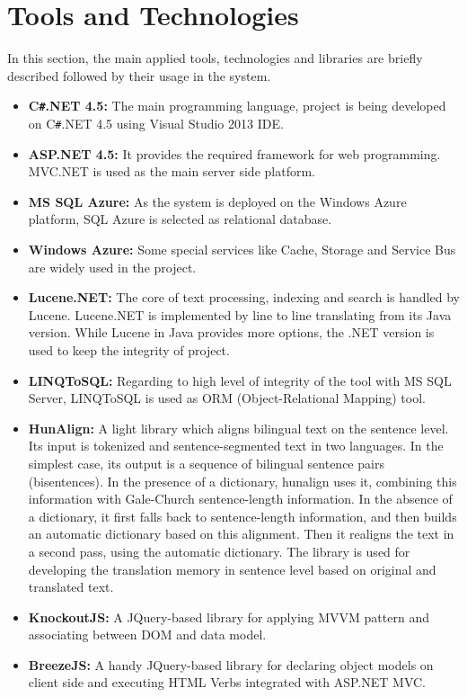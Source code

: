 \section{Tools and Technologies}
\label{sec:tools}
In this section, the main applied tools, technologies and libraries are briefly described followed by their usage in the system.

\begin{itemize}
	\item \textbf{C\texttt{\#}.NET 4.5:} The main programming language, project is being developed on C\texttt{\#}.NET 4.5 using Visual Studio 2013 IDE.
	\item \textbf{ASP.NET 4.5:} It provides the required framework for web programming. MVC.NET is used as the main server side platform.
	\item \textbf{MS SQL Azure:} As the system is deployed on the Windows Azure platform, SQL Azure is selected as relational database.
	\item \textbf{Windows Azure:} Some special services like Cache, Storage and Service Bus are widely used in the project.
	\item \textbf{Lucene.NET:} The core of text processing, indexing and search is handled by Lucene. Lucene.NET is implemented by line to line translating from its Java version. While Lucene in Java provides more options, the .NET version is used to keep the integrity of project.
	\item \textbf{LINQToSQL:} Regarding to high level of integrity of the tool with MS SQL Server, LINQToSQL is used as ORM (Object-Relational Mapping) tool.
	\item \textbf{HunAlign\cite{hunalign}:} A light library which aligns bilingual text on the sentence level. Its input is tokenized and sentence-segmented text in two languages. In the simplest case, its output is a sequence of bilingual sentence pairs (bisentences). In the presence of a dictionary, hunalign uses it, combining this information  with Gale-Church sentence-length information. In the absence of a dictionary, it first falls back to sentence-length information, and then builds an automatic dictionary based on this alignment. Then it realigns the text in a second pass, using the automatic dictionary. The library is used for developing the translation memory in sentence level based on original and translated text.
	\item \textbf{KnockoutJS:} A JQuery-based library for applying MVVM pattern and associating between DOM and data model.
	\item \textbf{BreezeJS:} A handy JQuery-based library for declaring object models on client side and executing HTML Verbs integrated with ASP.NET MVC.

\end{itemize}
